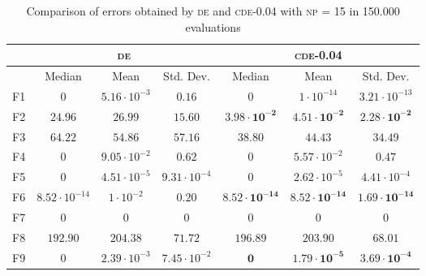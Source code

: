 \begin{table}[!t]
\caption{Comparison of errors obtained by \textsc{de} and \textsc{cde}-0.04 with \textsc{np} = 15 in 150.000 evaluations}
\label{tab:pop_15}
\centering
\begin{scriptsize}
\begin{tabular}{c || c c c | c c c }
\hline
 & \multicolumn{3}{|c|}{\textsc{de}} & \multicolumn{3}{|c}{\textsc{cde-0.04}} \\ \hline
    & Median                 & Mean                  & Std. Dev.             & Median                & Mean                  & Std. Dev.             \\ \hline
F1  & $0$                    & $5.16 \cdot 10^{-3}$  & $0.16$                & $0$                   & $1 \cdot 10^{-14}$                   & $3.21 \cdot 10^{-13}$ \\ \hline
F2  & $24.96$                & $26.99$               & $15.60$               & $\mathbf{3.98 \cdot 10^{-2}}$  & $\mathbf{4.51 \cdot 10^{-2}}$  & $\mathbf{2.28 \cdot 10^{-2}}$  \\ \hline
F3  & $64.22$                & $54.86$               & $57.16$               & $\mathbf{38.80}$               & $\mathbf{44.43}$               & $\mathbf{34.49}$               \\ \hline
F4  & $0$                    & $9.05 \cdot 10^{-2}$  & $0.62$                & $0$                   & $5.57 \cdot 10^{-2}$  & $0.47$                \\ \hline
F5  & $0$                    & $4.51 \cdot 10^{-5}$  & $9.31 \cdot 10^{-4}$  & $0$                   & $2.62 \cdot 10^{-5}$  & $4.41 \cdot 10^{-4}$  \\ \hline
F6  & $8.52 \cdot 10^{-14}$  & $1 \cdot 10^{-2} $    & $0.20$                & $\mathbf{8.52 \cdot 10^{-14}}$ & $\mathbf{8.52 \cdot 10^{-14}}$ & $\mathbf{1.69 \cdot 10^{-14}}$ \\ \hline
F7  & $0$                    & $0$                   & $0$                   & $0$                   & $0$                   & $0$                   \\ \hline
F8  & $192.90$               & $204.38$              & $71.72$               & $196.89$              & $203.90$              & $68.01$               \\ \hline
F9  & $0$                    & $2.39 \cdot 10^{-3}$  & $7.45 \cdot 10^{-2}$  & $\mathbf{0}$                   & $\mathbf{1.79 \cdot 10^{-5}}$  & $\mathbf{3.69 \cdot 10^{-4}}$  \\ \hline

\end{tabular}
\end{scriptsize}
\end{table}
